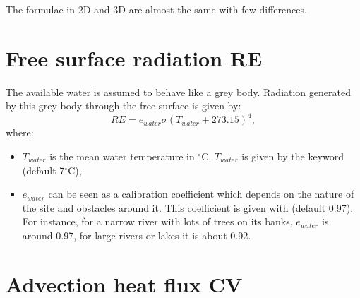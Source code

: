 The formulae in 2D and 3D are almost the same with few differences.


\section{Free surface radiation RE}

The available water is assumed to behave like a grey body.
Radiation generated by this grey body through the free surface is given by:
\begin{equation*}
RE = e_{water}\sigma\left(T_{water}+273.15 \right)^4,
\end{equation*}
where:
\begin{itemize}
\item $T_{water}$ is the mean water temperature in ${}^\circ$C.
$T_{water}$ is given by the keyword  (default 7${}^\circ$C),
\item $e_{water}$ can be seen as a calibration coefficient which depends on the nature
of the site and obstacles around it.
This coefficient is given with
 (default 0.97).
For instance, for a narrow river with lots of trees on its banks,
$e_{water}$ is around 0.97, for large rivers or lakes it is about 0.92.
\end{itemize}


\section{Advection heat flux CV}

